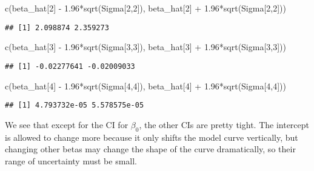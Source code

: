 \documentclass[
]{article}
\newenvironment{Shaded}{\begin{snugshade}}{\end{snugshade}}
\newcommand{\DecValTok}[1]{\textcolor[rgb]{0.00,0.00,0.81}{#1}}
\newcommand{\FloatTok}[1]{\textcolor[rgb]{0.00,0.00,0.81}{#1}}
\newcommand{\FunctionTok}[1]{\textcolor[rgb]{0.00,0.00,0.00}{#1}}
\newcommand{\NormalTok}[1]{#1}
\newcommand{\SpecialCharTok}[1]{\textcolor[rgb]{0.00,0.00,0.00}{#1}}
\begin{document}
\begin{Shaded}
\begin{Highlighting}[]
\FunctionTok{c}\NormalTok{(beta\_hat[}\DecValTok{2}\NormalTok{] }\SpecialCharTok{{-}} \FloatTok{1.96}\SpecialCharTok{*}\FunctionTok{sqrt}\NormalTok{(Sigma[}\DecValTok{2}\NormalTok{,}\DecValTok{2}\NormalTok{]), beta\_hat[}\DecValTok{2}\NormalTok{] }\SpecialCharTok{+} \FloatTok{1.96}\SpecialCharTok{*}\FunctionTok{sqrt}\NormalTok{(Sigma[}\DecValTok{2}\NormalTok{,}\DecValTok{2}\NormalTok{]))}
\end{Highlighting}
\end{Shaded}

\begin{verbatim}
## [1] 2.098874 2.359273
\end{verbatim}

\begin{Shaded}
\begin{Highlighting}[]
\FunctionTok{c}\NormalTok{(beta\_hat[}\DecValTok{3}\NormalTok{] }\SpecialCharTok{{-}} \FloatTok{1.96}\SpecialCharTok{*}\FunctionTok{sqrt}\NormalTok{(Sigma[}\DecValTok{3}\NormalTok{,}\DecValTok{3}\NormalTok{]), beta\_hat[}\DecValTok{3}\NormalTok{] }\SpecialCharTok{+} \FloatTok{1.96}\SpecialCharTok{*}\FunctionTok{sqrt}\NormalTok{(Sigma[}\DecValTok{3}\NormalTok{,}\DecValTok{3}\NormalTok{]))}
\end{Highlighting}
\end{Shaded}

\begin{verbatim}
## [1] -0.02277641 -0.02009033
\end{verbatim}

\begin{Shaded}
\begin{Highlighting}[]
\FunctionTok{c}\NormalTok{(beta\_hat[}\DecValTok{4}\NormalTok{] }\SpecialCharTok{{-}} \FloatTok{1.96}\SpecialCharTok{*}\FunctionTok{sqrt}\NormalTok{(Sigma[}\DecValTok{4}\NormalTok{,}\DecValTok{4}\NormalTok{]), beta\_hat[}\DecValTok{4}\NormalTok{] }\SpecialCharTok{+} \FloatTok{1.96}\SpecialCharTok{*}\FunctionTok{sqrt}\NormalTok{(Sigma[}\DecValTok{4}\NormalTok{,}\DecValTok{4}\NormalTok{]))}
\end{Highlighting}
\end{Shaded}

\begin{verbatim}
## [1] 4.793732e-05 5.578575e-05
\end{verbatim}

We see that except for the CI for \(\beta_0\), the other CIs are pretty
tight. The intercept is allowed to change more because it only shifts
the model curve vertically, but changing other betas may change the
shape of the curve dramatically, so their range of uncertainty must be
small.
\end{document}

